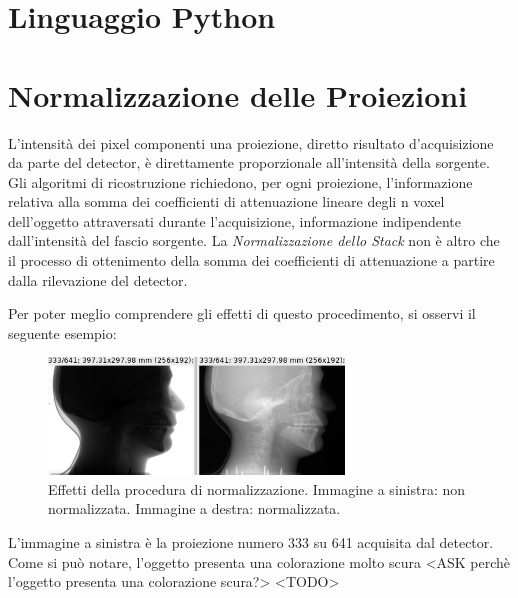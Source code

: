 \documentclass[a4paper,12pt, doubleside]{report}
\begin{document}
        \section{Linguaggio Python}
            
        \section{Normalizzazione delle Proiezioni}
            \label{sec:normalizzation}
            \par
                L'intensità dei pixel componenti una proiezione, diretto risultato d'acquisizione da parte del detector, è direttamente proporzionale all'intensità della sorgente. Gli algoritmi di ricostruzione richiedono, per ogni proiezione, l'informazione relativa alla somma dei coefficienti di attenuazione lineare degli n voxel dell'oggetto attraversati durante l'acquisizione, informazione indipendente dall'intensità del fascio sorgente. La \textit{Normalizzazione dello Stack} non è altro che il processo di ottenimento della somma dei coefficienti di attenuazione a partire dalla rilevazione del detector.
            \par
                Per poter meglio comprendere gli effetti di questo procedimento, si osservi il seguente esempio:
                
                \begin{figure}[h]
                    \centering
                    \includegraphics[width=0.7\textwidth]{normalization}
                    \caption{Effetti della procedura di normalizzazione. Immagine a sinistra: non normalizzata. Immagine a destra: normalizzata.}
                    \label{fig:skull-phantom}
                \end{figure}
                
                L'immagine a sinistra è la proiezione numero 333 su 641 acquisita dal detector. Come si può notare, l'oggetto presenta una colorazione molto scura
                <ASK perchè l'oggetto presenta una colorazione scura?> <TODO>
                
            
\end{document}
